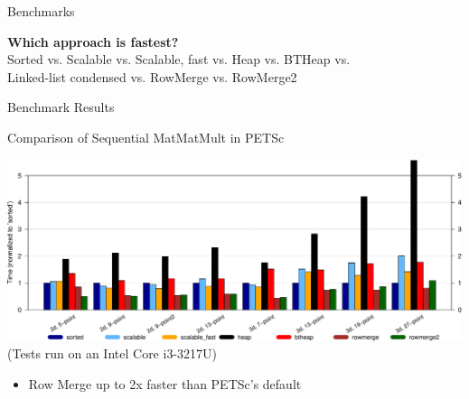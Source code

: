 




\begin{frame}{Benchmarks}

 \begin{center}
   {\Large \textbf{Which approach is fastest?}} \\[1em]
 
 {\footnotesize Sorted vs. Scalable vs. Scalable, fast vs. Heap vs. BTHeap vs. \\
 Linked-list condensed vs. RowMerge vs. RowMerge2 }
 \end{center}

\end{frame}

\begin{frame}{Benchmark Results}
\begin{block}{Comparison of Sequential MatMatMult in PETSc}
 \begin{center}
  \includegraphics[width=0.999\textwidth]{figures/petsc-matmatmult-crop} \\[1em]
  {\scriptsize (Tests run on an Intel Core i3-3217U)}
 \end{center}
 \begin{itemize}
  \item Row Merge up to 2x faster than PETSc's default
 \end{itemize}
\end{block}
\end{frame}



